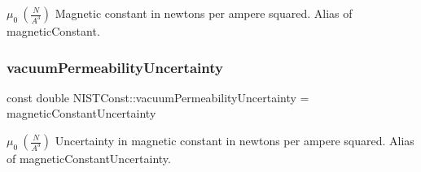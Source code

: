 $\mu_0 \ (\frac{N}{A^3})$ Magnetic constant in newtons per ampere squared. Alias of magnetic\+Constant. \mbox{\label{group___n_i_s_t_const-_magnetic_constant_gaf9ad0468a42a06fab2ba9738f20aa68b}} 
\subsubsection{\texorpdfstring{vacuum\+Permeability\+Uncertainty}{vacuumPermeabilityUncertainty}}
{\footnotesize\ttfamily const double N\+I\+S\+T\+Const\+::vacuum\+Permeability\+Uncertainty = magnetic\+Constant\+Uncertainty}

$\mu_0 \ (\frac{N}{A^3})$ Uncertainty in magnetic constant in newtons per ampere squared. Alias of magnetic\+Constant\+Uncertainty. 